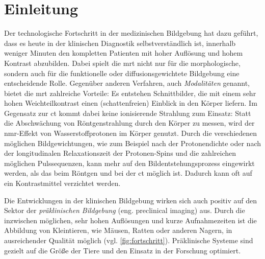 \chapter{Einleitung}
Der technologische Fortschritt in der medizinischen Bildgebung hat dazu geführt, dass es heute in der klinischen Diagnostik selbstverständlich ist, innerhalb weniger Minuten den kompletten Patienten  mit hoher Auflösung und hohem Kontrast abzubilden.
Dabei spielt die \gls{mrt} nicht nur für die morphologische, sondern auch für die funktionelle oder diffusionsgewichtete Bildgebung eine entscheidende Rolle. Gegenüber anderen Verfahren, auch \textit{Modalitäten} genannt, bietet die \gls{mrt} zahlreiche Vorteile: Es entstehen Schnittbilder, die mit einem sehr hohen Weichteilkontrast einen (schattenfreien) Einblick in den Körper liefern. Im Gegensatz zur \gls{ct} kommt dabei keine ionisierende Strahlung zum Einsatz: Statt die Abschwächung von Röntgenstrahlung durch den Körper zu messen, wird der \gls{nmr}-Effekt von Wasserstoffprotonen im Körper genutzt. Durch die verschiedenen möglichen Bildgewichtungen, wie zum Beispiel nach der Protonendichte oder nach der longitudinalen Relaxationszeit der Protonen-Spins und die zahlreichen möglichen Pulssequenzen, kann mehr auf den Bildentstehungsprozess eingewirkt werden, als das beim Röntgen und bei der \gls{ct} möglich ist. Dadurch kann oft auf ein Kontrastmittel verzichtet werden.

Die Entwicklungen in der klinischen Bildgebung wirken sich auch positiv auf den Sektor der \textit{präklinischen Bildgebung} (eng. preclinical imaging) aus. Durch die inzwischen möglichen, sehr hohen Auflösungen und kurze Aufnahmezeiten ist die Abbildung von Kleintieren, wie Mäusen, Ratten oder anderen Nagern, in ausreichender Qualität möglich (vgl. \autoref{fig:fortschritt}). Präklinische Systeme sind gezielt auf die Größe der Tiere und den Einsatz in der Forschung optimiert.

